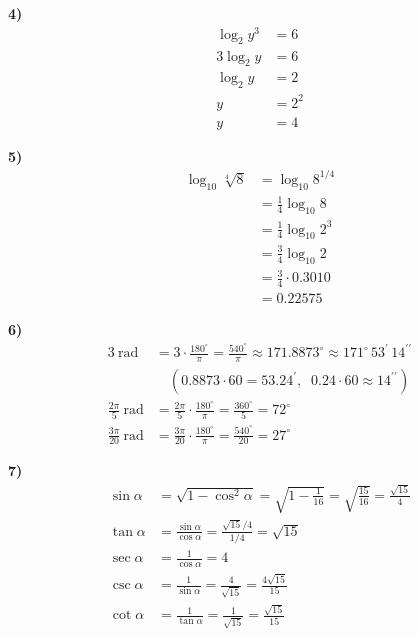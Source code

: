 \documentclass[11pt,a4paper,fleqn]{article}
\begin{document}
\textbf{4)}
\begin{align*}
  \log_{2} y^{3} &= 6 \\
  3 \log_{2} y   &= 6 \\
  \log_{2} y     &= 2 \\
  y              &= 2^{2} \\
  y              &= 4
\end{align*}

\textbf{5)}
\begin{align*}
  \log_{10} \sqrt[4]{8}
    &= \log_{10} 8^{1/4} \\
    &= \frac{1}{4} \log_{10} 8 \\
    &= \frac{1}{4} \log_{10} 2^{3} \\
    &= \frac{3}{4} \log_{10} 2 \\
    &= \frac{3}{4} \cdot 0.3010 \\
    &= 0.22575
\end{align*}

\textbf{6)}
\begin{align*}
  3\ \text{rad}
    &= 3 \cdot \frac{180^{\circ}}{\pi} = \frac{540^{\circ}}{\pi}
     \approx 171.8873^{\circ} \approx 171^{\circ}\,53^{\prime}\,14^{\prime\prime} \\
    &\quad \left( 0.8873 \cdot 60 = 53.24^{\prime}, \;\;
                  0.24 \cdot 60 \approx 14^{\prime\prime} \right) \\[8pt]
  \frac{2\pi}{5}\ \text{rad}
    &= \frac{2\pi}{5} \cdot \frac{180^{\circ}}{\pi} = \frac{360^{\circ}}{5} = 72^{\circ} \\[8pt]
  \frac{3\pi}{20}\ \text{rad}
    &= \frac{3\pi}{20} \cdot \frac{180^{\circ}}{\pi} = \frac{540^{\circ}}{20} = 27^{\circ}
\end{align*}

\textbf{7)}
\begin{align*}
  \sin\alpha
    &= \sqrt{1 - \cos^{2}\alpha}
     = \sqrt{1 - \frac{1}{16}}
     = \sqrt{\frac{15}{16}}
     = \frac{\sqrt{15}}{4} \\[6pt]
  \tan\alpha
    &= \frac{\sin\alpha}{\cos\alpha}
     = \frac{\sqrt{15}/4}{1/4}
     = \sqrt{15} \\[6pt]
  \sec\alpha
    &= \frac{1}{\cos\alpha} = 4 \\[6pt]
  \csc\alpha
    &= \frac{1}{\sin\alpha}
     = \frac{4}{\sqrt{15}}
     = \frac{4\sqrt{15}}{15} \\[6pt]
  \cot\alpha
    &= \frac{1}{\tan\alpha}
     = \frac{1}{\sqrt{15}}
     = \frac{\sqrt{15}}{15}
\end{align*}
\end{document}

